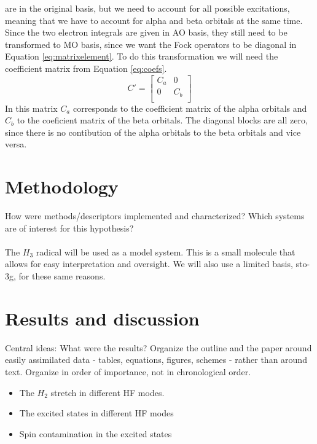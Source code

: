 \documentclass[twoside,twocolumn,9pt]{article}
\begin{document}
are in the original basis, but we need to account for all possible excitations, meaning that we have to account for alpha and beta orbitals at the same time. Since the two electron 
integrals are given in AO basis, they still need to be transformed to MO basis, since we want the Fock operators to be diagonal in Equation \eqref{eq:matrixelement}. To do this 
transformation we will need the coefficient matrix from Equation \eqref{eq:coefs}.
\begin{equation}\label{eq:coefs}
    C' = \begin{bmatrix}
        C_a & 0 \\
        0 & C_b \\
    \end{bmatrix}
\end{equation} 
In this matrix $C_a$ corresponds to the coefficient matrix of the alpha orbitals and $C_b$ to the coeficient matrix of the beta orbitals. The diagonal blocks are all zero, since there 
is no contibution of the alpha orbitals to the beta orbitals and vice versa. 


\section{Methodology}

How were methods/descriptors implemented and characterized? Which systems are of interest for this hypothesis?
\paragraph*{}
The $H_3$ radical will be used as a model system. This is a small molecule that allows for easy interpretation and oversight. We will also use a limited basis, sto-3g, for these same reasons.
\section{Results and discussion}

Central ideas: What were the results? Organize the outline and the paper around easily assimilated data - tables, equations, figures, schemes - rather than around text. Organize in order of importance, not in chronological order.

\begin{itemize}
    \item The $H_2$ stretch in different HF modes.
    \item The excited states in different HF modes
    \item Spin contamination in the excited states
\end{itemize}
\end{document}
